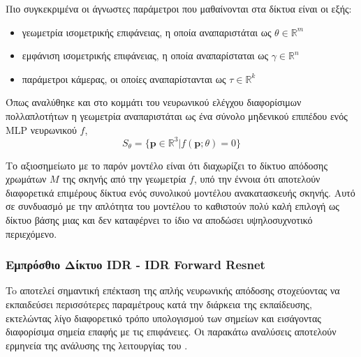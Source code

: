     Πιο συγκεκριμένα οι άγνωστες παράμετροι που μαθαίνονται στα δίκτυα είναι οι εξής:
\begin{itemize}
    \item γεωμετρία ισομετρικής επιφάνειας, η οποία αναπαριστάται ως $\theta \in \mathbb{R}^{m}$    
    \item εμφάνιση ισομετρικής επιφάνειας, η οποία αναπαρίσταται ως $\gamma \in \mathbb{R}^{n}$   
    \item παράμετροι κάμερας, οι οποίες αναπαρίστανται ως $\tau \in \mathbb{R}^{k}$    
\end{itemize}
Όπως αναλύθηκε και στο κομμάτι του νευρωνικού ελέγχου διαφορίσιμων πολλαπλοτήτων η γεωμετρία αναπαριστάται ως ένα σύνολο μηδενικού επιπέδου ενός MLP  νευρωνικού $f$, 
\begin{equation}
    S_{\theta} = \{\textbf{p} \in\mathbb{R}^{3}  |  f(\textbf{p};\theta) = 0\}
    \label{eq:sdfequation}
\end{equation}
\par
    Το αξιοσημείωτο με το παρόν μοντέλο είναι ότι διαχωρίζει το δίκτυο απόδοσης χρωμάτων $M$  της σκηνής από την γεωμετρία $f$, υπό την έννοια ότι αποτελούν διαφορετικά επιμέρους δίκτυα ενός συνολικού μοντέλου ανακατασκευής σκηνής. Αυτό σε συνδυασμό με την απλότητα του μοντέλου το καθιστούν πολύ καλή επιλογή ως δίκτυο βάσης μιας και δεν καταφέρνει το ίδιο να αποδώσει υψηλοσυχνοτικό περιεχόμενο. 

\subsubsection{Εμπρόσθιο Δίκτυο IDR - IDR Forward Resnet}
    To  αποτελεί σημαντική επέκταση της απλής νευρωνικής απόδοσης στοχεύοντας να εκπαιδεύσει περισσότερες παραμέτρους κατά την διάρκεια της εκπαίδευσης, εκτελώντας λίγο διαφορετικό τρόπο υπολογισμού των σημείων και εισάγοντας διαφορίσιμα σημεία επαφής με τις επιφάνειες. Οι παρακάτω αναλύσεις αποτελούν ερμηνεία της ανάλυσης της λειτουργίας του   \cite{yariv2020multiview}.

